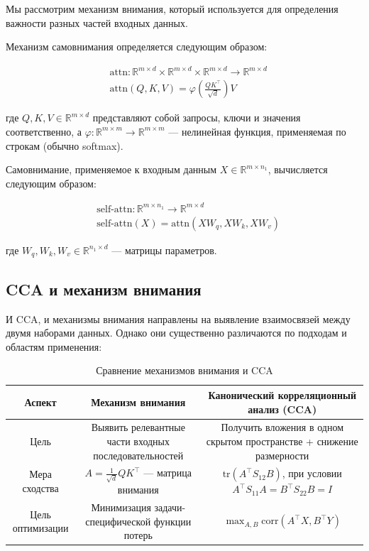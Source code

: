 \documentclass[a4paper,14pt]{article}
\theoremstyle{plain} %
\theoremstyle{definition} %
\theoremstyle{remark} %
\begin{document}
         Мы рассмотрим механизм внимания, который используется для определения важности разных частей входных данных. 

        Механизм самовнимания определяется следующим образом:
	
\begin{equation}
	\begin{aligned}
		&\text{attn}: \mathbb{R}^{m \times d} \times \mathbb{R}^{m \times d} \times \mathbb{R}^{m \times d} \longrightarrow \mathbb{R}^{m \times d} \\
		&\text{attn}(Q, K, V) = \varphi\left(\frac{Q K^\top}{\sqrt{d}}\right) V
	\end{aligned}
	\label{attn}
\end{equation}

где $Q, K, V \in \mathbb{R}^{m \times d}$ представляют собой запросы, ключи и значения соответственно, а $\varphi: \mathbb{R}^{m \times m} \longrightarrow \mathbb{R}^{m \times m}$ — нелинейная функция, применяемая по строкам (обычно softmax).

Самовнимание, применяемое к входным данным $X \in \mathbb{R}^{m \times n_1}$, вычисляется следующим образом:

\begin{equation}
	\begin{aligned}
		&\text{self-attn}: \mathbb{R}^{m \times n_1} \longrightarrow \mathbb{R}^{m \times d} \\
		&\text{self-attn}(X) = \text{attn}(X W_q, X W_k, X W_v)
	\end{aligned}
	\label{self-attn}
\end{equation}

где $W_q, W_k, W_v \in \mathbb{R}^{n_1 \times d}$ — матрицы параметров.

\subsection{CCA и механизм внимания}

И CCA, и механизмы внимания направлены на выявление взаимосвязей между двумя наборами данных. Однако они существенно различаются по подходам и областям применения:

\setlength{\extrarowheight}{3mm}
\begin{table}[bhtp]
	\centering
	\begin{tabulary}{\textwidth}{|C|C|C|}
		\hline
		\textbf{Аспект} & \textbf{Механизм внимания} & \textbf{Канонический корреляционный анализ (CCA)} \\
		\hline
		Цель & Выявить релевантные части входных последовательностей & Получить вложения в одном скрытом пространстве + снижение размерности \\
		\hline
		Мера сходства & $A = \frac{1}{\sqrt{d}} Q K^\top$ — матрица внимания & $\text{tr}(A^\top S_{12} B)$, при условии $A^\top S_{11} A = B^\top S_{22} B = I$ \\
		\hline
		Цель оптимизации & Минимизация задачи-специфической функции потерь & $\max_{A,B} \text{corr}(A^\top X, B^\top Y)$ \\
		\hline
	\end{tabulary}
	\caption{Сравнение механизмов внимания и CCA}
\end{table}
\end{document}
